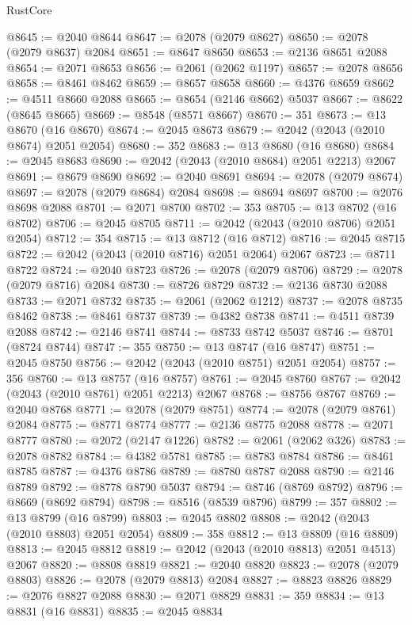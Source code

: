 \begin{lexlean}{RustCore}
\begin{coremodule}
@8645 := @2040 @8644
@8647 := @2078 (@2079 @8627)
@8650 := @2078 (@2079 @8637) @2084
@8651 := @8647 @8650
@8653 := @2136 @8651 @2088
@8654 := @2071 @8653
@8656 := @2061 (@2062 @1197)
@8657 := @2078 @8656
@8658 := @8461 @8462
@8659 := @8657 @8658
@8660 := @4376 @8659
@8662 := @4511 @8660 @2088
@8665 := @8654 (@2146 @8662) @5037
@8667 := @8622 (@8645 @8665)
@8669 := @8548 (@8571 @8667)
@8670 := 351
@8673 := @13 @8670 (@16 @8670)
@8674 := @2045 @8673
@8679 := @2042 (@2043 (@2010 @8674) @2051 @2054)
@8680 := 352
@8683 := @13 @8680 (@16 @8680)
@8684 := @2045 @8683
@8690 := @2042 (@2043 (@2010 @8684) @2051 @2213) @2067
@8691 := @8679 @8690
@8692 := @2040 @8691
@8694 := @2078 (@2079 @8674)
@8697 := @2078 (@2079 @8684) @2084
@8698 := @8694 @8697
@8700 := @2076 @8698 @2088
@8701 := @2071 @8700
@8702 := 353
@8705 := @13 @8702 (@16 @8702)
@8706 := @2045 @8705
@8711 := @2042 (@2043 (@2010 @8706) @2051 @2054)
@8712 := 354
@8715 := @13 @8712 (@16 @8712)
@8716 := @2045 @8715
@8722 := @2042 (@2043 (@2010 @8716) @2051 @2064) @2067
@8723 := @8711 @8722
@8724 := @2040 @8723
@8726 := @2078 (@2079 @8706)
@8729 := @2078 (@2079 @8716) @2084
@8730 := @8726 @8729
@8732 := @2136 @8730 @2088
@8733 := @2071 @8732
@8735 := @2061 (@2062 @1212)
@8737 := @2078 @8735 @8462
@8738 := @8461 @8737
@8739 := @4382 @8738
@8741 := @4511 @8739 @2088
@8742 := @2146 @8741
@8744 := @8733 @8742 @5037
@8746 := @8701 (@8724 @8744)
@8747 := 355
@8750 := @13 @8747 (@16 @8747)
@8751 := @2045 @8750
@8756 := @2042 (@2043 (@2010 @8751) @2051 @2054)
@8757 := 356
@8760 := @13 @8757 (@16 @8757)
@8761 := @2045 @8760
@8767 := @2042 (@2043 (@2010 @8761) @2051 @2213) @2067
@8768 := @8756 @8767
@8769 := @2040 @8768
@8771 := @2078 (@2079 @8751)
@8774 := @2078 (@2079 @8761) @2084
@8775 := @8771 @8774
@8777 := @2136 @8775 @2088
@8778 := @2071 @8777
@8780 := @2072 (@2147 @1226)
@8782 := @2061 (@2062 @326)
@8783 := @2078 @8782
@8784 := @4382 @5781
@8785 := @8783 @8784
@8786 := @8461 @8785
@8787 := @4376 @8786
@8789 := @8780 @8787 @2088
@8790 := @2146 @8789
@8792 := @8778 @8790 @5037
@8794 := @8746 (@8769 @8792)
@8796 := @8669 (@8692 @8794)
@8798 := @8516 (@8539 @8796)
@8799 := 357
@8802 := @13 @8799 (@16 @8799)
@8803 := @2045 @8802
@8808 := @2042 (@2043 (@2010 @8803) @2051 @2054)
@8809 := 358
@8812 := @13 @8809 (@16 @8809)
@8813 := @2045 @8812
@8819 := @2042 (@2043 (@2010 @8813) @2051 @4513) @2067
@8820 := @8808 @8819
@8821 := @2040 @8820
@8823 := @2078 (@2079 @8803)
@8826 := @2078 (@2079 @8813) @2084
@8827 := @8823 @8826
@8829 := @2076 @8827 @2088
@8830 := @2071 @8829
@8831 := 359
@8834 := @13 @8831 (@16 @8831)
@8835 := @2045 @8834

\end{coremodule}
\end{lexlean}

